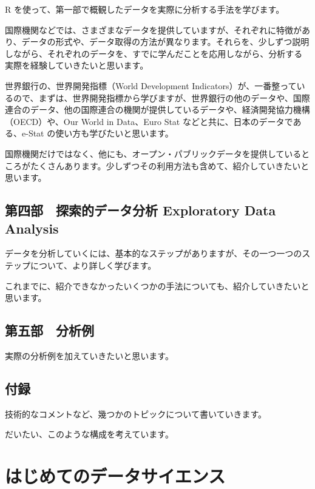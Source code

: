 \documentclass[
  xelatex, ja=standard]{bxjsbook}
\theoremstyle{definition}
\theoremstyle{definition}
\theoremstyle{definition}
\theoremstyle{definition}
\theoremstyle{remark}
\begin{document}
R を使って、第一部で概観したデータを実際に分析する手法を学びます。

国際機関などでは、さまざまなデータを提供していますが、それぞれに特徴があり、データの形式や、データ取得の方法が異なります。それらを、少しずつ説明しながら、それぞれのデータを、すでに学んだことを応用しながら、分析する実際を経験していきたいと思います。

世界銀行の、世界開発指標（World Development Indicators）が、一番整っているので、まずは、世界開発指標から学びますが、世界銀行の他のデータや、国際連合のデータ、他の国際連合の機関が提供しているデータや、経済開発協力機構（OECD）や、Our World in Data、Euro Stat などと共に、日本のデータである、e-Stat の使い方も学びたいと思います。

国際機関だけではなく、他にも、オープン・パブリックデータを提供しているところがたくさんあります。少しずつその利用方法も含めて、紹介していきたいと思います。

\hypertarget{ux7b2cux56dbux90e8-ux63a2ux7d22ux7684ux30c7ux30fcux30bfux5206ux6790-exploratory-data-analysis}{%
\section{第四部　探索的データ分析 Exploratory Data Analysis}\label{ux7b2cux56dbux90e8-ux63a2ux7d22ux7684ux30c7ux30fcux30bfux5206ux6790-exploratory-data-analysis}}

データを分析していくには、基本的なステップがありますが、その一つ一つのステップについて、より詳しく学びます。

これまでに、紹介できなかったいくつかの手法についても、紹介していきたいと思います。

\hypertarget{ux7b2cux4e94ux90e8-ux5206ux6790ux4f8b}{%
\section{第五部　分析例}\label{ux7b2cux4e94ux90e8-ux5206ux6790ux4f8b}}

実際の分析例を加えていきたいと思います。

\hypertarget{ux4ed8ux9332}{%
\section{付録}\label{ux4ed8ux9332}}

技術的なコメントなど、幾つかのトピックについて書いていきます。

だいたい、このような構成を考えています。

\hypertarget{first-example}{%
\chapter{はじめてのデータサイエンス}\label{first-example}}
\end{document}
